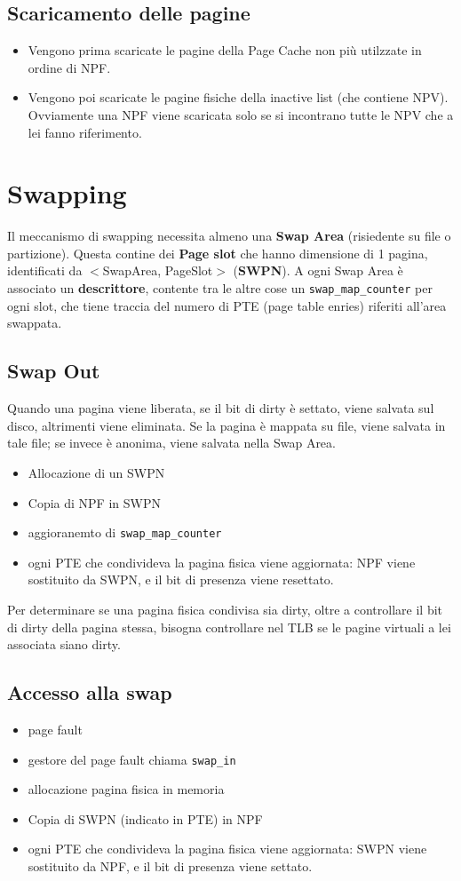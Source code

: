 \documentclass[12pt, a4paper]{report}
\begin{document}
\subsection{Scaricamento delle pagine}
\begin{itemize}
	\item Vengono prima scaricate le pagine della Page Cache non più utilzzate
		in ordine di NPF.
	\item Vengono poi scaricate le pagine fisiche della inactive list (che
		contiene NPV). Ovviamente una NPF viene scaricata solo se si incontrano
		tutte le NPV che a lei fanno riferimento.
\end{itemize}

\section{Swapping}
Il meccanismo di swapping necessita almeno una \textbf{Swap Area} (risiedente su
file o partizione). Questa contine dei \textbf{Page slot} che hanno dimensione
di 1 pagina, identificati da $<$SwapArea, PageSlot$>$ (\textbf{SWPN}). A ogni
Swap Area è associato un \textbf{descrittore}, contente tra le altre cose un
\texttt{swap\_map\_counter} per ogni slot, che tiene traccia del numero di PTE
(page table enries) riferiti all'area swappata.
\subsection{Swap Out}
Quando una pagina viene liberata, se il bit di dirty è settato, viene salvata
sul disco, altrimenti viene eliminata. Se la pagina è mappata su file, viene
salvata in tale file; se invece è anonima, viene salvata nella Swap Area.
\begin{itemize}
	\item Allocazione di un SWPN
	\item Copia di NPF in SWPN
	\item aggioranemto di \texttt{swap\_map\_counter}
	\item ogni PTE che condivideva la pagina fisica viene aggiornata:
		NPF viene sostituito da SWPN, e il bit di presenza viene
		resettato.
\end{itemize}
Per determinare se una pagina fisica condivisa sia dirty, oltre a controllare il
bit di dirty della pagina stessa, bisogna controllare nel TLB se le pagine
virtuali a lei associata siano dirty. %
\subsection{Accesso alla swap}
\begin{itemize}
	\item page fault
	\item gestore del page fault chiama \texttt{swap\_in}
	\item allocazione pagina fisica in memoria
	\item Copia di SWPN (indicato in PTE) in NPF
	\item ogni PTE che condivideva la pagina fisica viene aggiornata: SWPN viene
		sostituito da NPF, e il bit di presenza viene settato.
\end{itemize}
\end{document}
